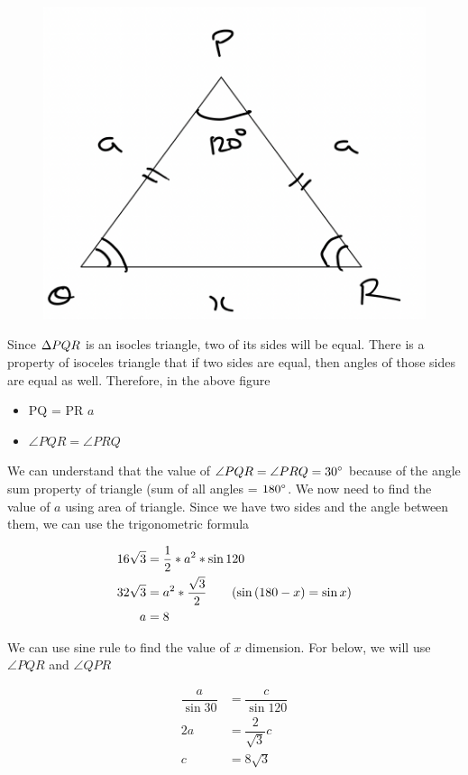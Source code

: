 

\begin{figure}[h!]
    \centering
    \includegraphics[width=0.5\linewidth]{Quant//Geometry//Images//Triangles/triangles_11_question_1.png}
\end{figure}

Since $\Delta {PQR}$ is an isocles triangle, two of its sides will be equal. There is a property of isoceles triangle that if two sides are equal, then angles of those sides are equal as well. Therefore, in the above figure
\begin{itemize}
    \item PQ = PR $a$
    \item $\angle{PQR} = \angle{PRQ}$
\end{itemize}

We can understand that the value of $\angle{PQR} = \angle{PRQ} = {30}^{\circ}$ because of the angle sum property of triangle (sum of all angles = ${180}^{\circ}$. We now need to find the value of $a$ using area of triangle. Since we have two sides and the angle between them, we can use the trigonometric formula

\begin{align*}
    16 \sqrt{3} &= \dfrac{1}{2} * a^2 * \sin{120} \\
    32 \sqrt{3} &= a^2 * \dfrac{\sqrt{3}}{2} \tag{$\sin{(180 - x)} = \sin{x}$} \\
    a &= 8
\end{align*}

We can use sine rule to find the value of $x$ dimension. For below, we will use $\angle{PQR}$ and $\angle{QPR}$

\begin{align*}
    \dfrac{a}{\sin{30}} &= \dfrac{c}{\sin{120}} \\
    2a &= \dfrac{2}{\sqrt{3}} c \\
    c &= 8 \sqrt{3}
\end{align*}

